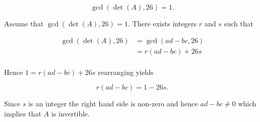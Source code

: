 \documentclass[a4paper]{article}
\begin{document}
$$\gcd(\det(A), 26) = 1.$$

Assume that $\gcd(\det(A), 26) = 1$. There exists integers $r$ and $s$ such that

\begin{align*}
\gcd(\det(A), 26) &= \gcd(ad - bc, 26) \\
&= r(ad-bc) + 26s \\
\end{align*}

Hence $1 = r(ad-bc) + 26s$ rearranging yields

$$r(ad - bc) = 1 - 26s.$$

Since $s$ is an integer the right hand side is non-zero and hence $ad - bc \neq 0$ which implies that $A$ is invertible.
\end{document}
